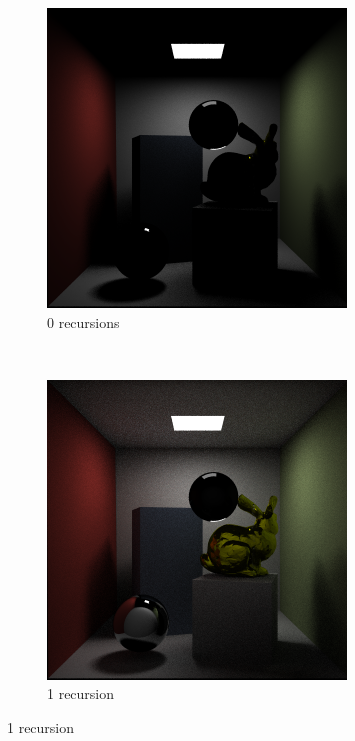 \documentclass[a4paper, 12pt]{report}
\begin{document}
\begin{figure}
        \centering
        \begin{subfigure}[h]{0.5\textwidth}
           \includegraphics[width=\textwidth]{figures/recursive_depth/recursion-1-100rpp.png}
	\caption{0 recursions}
	\label{fig:1rd}
        \end{subfigure}%
        ~ %
        \begin{subfigure}[h]{0.5\textwidth}
                \includegraphics[width=\textwidth]{figures/recursive_depth/recursion-2-100rpp.png}
                \caption{1 recursion}
                \label{fig:2rd}
        \end{subfigure}


\end{figure}
\end{document}
